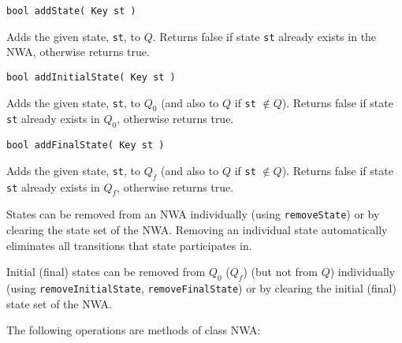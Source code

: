 \begin{description}

  \item\texttt{bool addState( Key st )} \nopagebreak

    Adds the given state, \texttt{st}, to $Q$.  Returns false if state
    \texttt{st} already exists in the NWA, otherwise returns true.

  \item\texttt{bool addInitialState( Key st )} \nopagebreak

    Adds the given state, \texttt{st}, to $Q_0 $ (and also to $Q$ if
    \texttt{st} $\not\in Q$).  Returns false if state \texttt{st} already
    exists in $Q_0$, otherwise returns true.

  \item\texttt{bool addFinalState( Key st )} \nopagebreak

    Adds the given state, \texttt{st}, to $Q_f$ (and also to $Q$ if
    \texttt{st} $\not\in Q$).  Returns false if state \texttt{st} already
    exists in $Q_f$, otherwise returns true.

\end{description}


States can be removed from an NWA individually (using \texttt{removeState})
or by clearing the state set of the NWA. 
Removing an individual state automatically eliminates all transitions that
state participates in.

Initial (final) states can be removed from $Q_0 $ ($Q_f$) (but not from $Q$)
individually (using \texttt{removeInitialState}, \texttt{removeFinalState})
or by clearing the initial (final) state set of the NWA.

\noindent The following operations are methods of class NWA:

